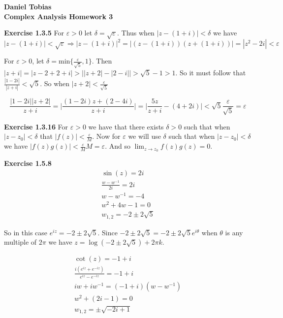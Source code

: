 \documentclass[a4paper]{article}
\begin{document}
{\noindent \textbf{Daniel Tobias \\ Complex Analysis Homework 3}}\vspace{10pt}


\textbf{Exercise 1.3.5} For $\varepsilon > 0$ let $\delta =
\sqrt{\varepsilon}$. Thus when $|z - (1+i)| < \delta$ we have
$|z - (1+i)| < \sqrt{\varepsilon} \Rightarrow |z-(1+i)|^{2} =
|(z-(1+i))(z+(1+i))| = |z^{2}-2i| < \varepsilon$ \vspace{10pt}

For $\varepsilon >0$, let $\delta = \text{min}\{\frac{\varepsilon}{\sqrt{5}},1\}$. Then
$|z+i| = |z - 2 + 2 + i| > \big||z+2| - |2-i|\big| > \sqrt{5} - 1 > 1$. So it
must follow that $\frac{|1-2i|}{|z+i|} < \sqrt{5}$. So when $|z+2| <
\frac{\varepsilon}{\sqrt{5}}$

$$\frac{|1-2i||z+2|}{z+i}= \Big | \frac{(1-2i)z+(2-4i)}{z+i}\Big | = \Big |
\frac{5z}{z+i}- (4+2i)\Big | < \sqrt{5}\frac{\varepsilon}{\sqrt{5}}=\varepsilon$$

\textbf{Exercise 1.3.16} For $\varepsilon>0$ we have that there exists $\delta >0$ such that
when $|z-z_{0}| < \delta$ that $|f(z)| < \frac{\varepsilon}{M}$. Now for
$\varepsilon$ we will use $\delta$ such that when $|z-z_{0}|<\delta$ we have
$|f(z)g(z)| < \frac{\varepsilon}{M} M = \varepsilon$. And so $\lim_{z\to z_{0}}
f(z)g(z) = 0$.\vspace{10pt}

\textbf{Exercise 1.5.8}
\begin{align*}
  \sin(z) = 2i\\
  \frac{w-w^{-1}}{2i}=2i\\
  w - w^{-1} = -4\\
  w^{2} + 4w -1 = 0\\
  w_{1,2} = -2\pm 2\sqrt{5}
\end{align*}

So in this case $e^{iz} = -2\pm 2\sqrt{5}$. Since $-2 \pm 2 \sqrt{5} = -2 \pm 2
\sqrt{5} e^{i \theta}$ when $\theta$ is any multiple of $2\pi$ we have $z =
\log(-2 \pm 2\sqrt{5})+ 2\pi k$.\vspace{10pt}

\begin{align*}
  \cot(z) = -1 + i\\
  \frac{i(e^{iz}+e^{-iz})}{e^{iz}-e^{-iz}} = -1 + i\\
  iw + iw^{-1} = (-1 + i)(w-w^{-1})\\
  w^{2}+(2i-1) = 0\\
  w_{1,2} = \pm \sqrt{-2i + 1}
\end{align*}
\end{document}
